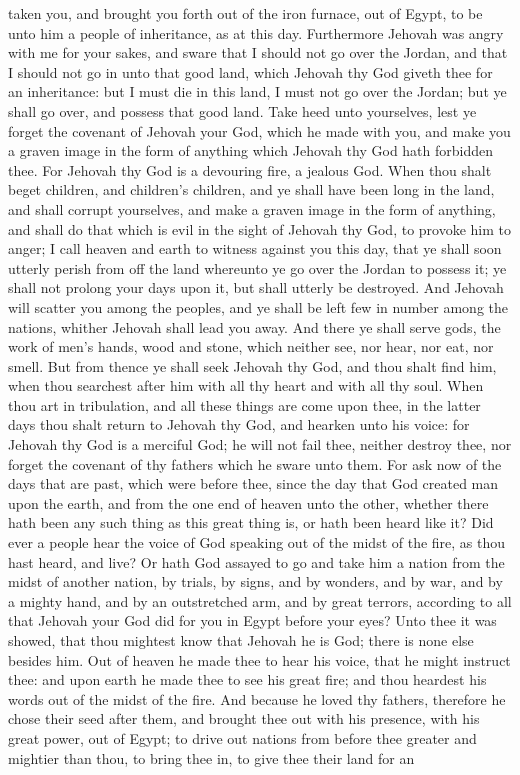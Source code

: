 taken you, and brought you forth out of the iron furnace, out of Egypt, to be unto him a people of inheritance, as at this day. Furthermore Jehovah was angry with me for your sakes, and sware that I should not go over the Jordan, and that I should not go in unto that good land, which Jehovah thy God giveth thee for an inheritance: but I must die in this land, I must not go over the Jordan; but ye shall go over, and possess that good land. Take heed unto yourselves, lest ye forget the covenant of Jehovah your God, which he made with you, and make you a graven image in the form of anything which Jehovah thy God hath forbidden thee. For Jehovah thy God is a devouring fire, a jealous God.  When thou shalt beget children, and children’s children, and ye shall have been long in the land, and shall corrupt yourselves, and make a graven image in the form of anything, and shall do that which is evil in the sight of Jehovah thy God, to provoke him to anger; I call heaven and earth to witness against you this day, that ye shall soon utterly perish from off the land whereunto ye go over the Jordan to possess it; ye shall not prolong your days upon it, but shall utterly be destroyed. And Jehovah will scatter you among the peoples, and ye shall be left few in number among the nations, whither Jehovah shall lead you away. And there ye shall serve gods, the work of men’s hands, wood and stone, which neither see, nor hear, nor eat, nor smell. But from thence ye shall seek Jehovah thy God, and thou shalt find him, when thou searchest after him with all thy heart and with all thy soul. When thou art in tribulation, and all these things are come upon thee, in the latter days thou shalt return to Jehovah thy God, and hearken unto his voice: for Jehovah thy God is a merciful God; he will not fail thee, neither destroy thee, nor forget the covenant of thy fathers which he sware unto them.  For ask now of the days that are past, which were before thee, since the day that God created man upon the earth, and from the one end of heaven unto the other, whether there hath been any such thing as this great thing is, or hath been heard like it? Did ever a people hear the voice of God speaking out of the midst of the fire, as thou hast heard, and live? Or hath God assayed to go and take him a nation from the midst of another nation, by trials, by signs, and by wonders, and by war, and by a mighty hand, and by an outstretched arm, and by great terrors, according to all that Jehovah your God did for you in Egypt before your eyes? Unto thee it was showed, that thou mightest know that Jehovah he is God; there is none else besides him. Out of heaven he made thee to hear his voice, that he might instruct thee: and upon earth he made thee to see his great fire; and thou heardest his words out of the midst of the fire. And because he loved thy fathers, therefore he chose their seed after them, and brought thee out with his presence, with his great power, out of Egypt; to drive out nations from before thee greater and mightier than thou, to bring thee in, to give thee their land for an 